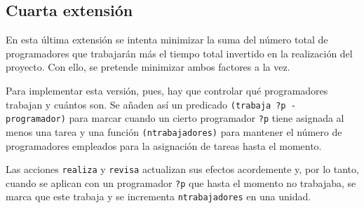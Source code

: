 
\subsection{Cuarta extensión} \label{sec:mod-ext4}

En esta última extensión se intenta minimizar la suma del número total de 
programadores que trabajarán más el tiempo total invertido en la realización 
del proyecto. Con ello, se pretende minimizar ambos factores a la vez.

Para implementar esta versión, pues, hay que controlar qué programadores 
trabajan y cuántos son. Se añaden así un predicado 
\texttt{(trabaja ?p - programador)} para marcar cuando un cierto programador 
\texttt{?p} tiene asignada al menos una tarea y una función 
\texttt{(ntrabajadores)} para mantener el número de programadores empleados 
para la asignación de tareas hasta el momento. 

Las acciones \texttt{realiza} y \texttt{revisa} actualizan sus efectos 
acordemente y, por lo tanto, cuando se aplican con un programador \texttt{?p} 
que hasta el momento no trabajaba, se marca que este trabaja y se incrementa 
\texttt{ntrabajadores} en una unidad.




